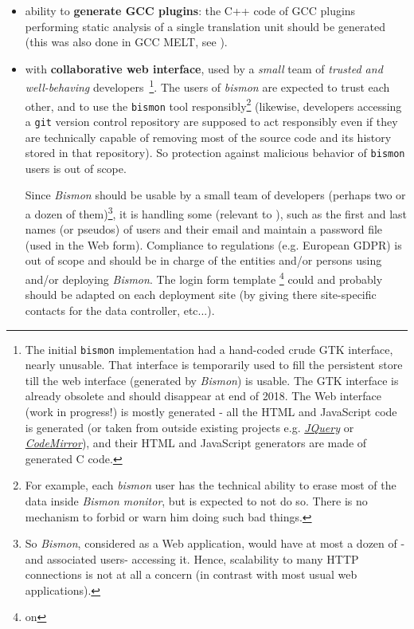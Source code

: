 \begin{itemize}
    \item ability to \textbf{generate GCC plugins}: the C++ code of
      GCC plugins  performing static analysis of a single translation
      unit should be generated (this was also done in GCC MELT, see \cite{Starynkevitch-DSL2011}).

    \item with \textbf{collaborative web interface},  used
      by a \emph{small} team of \emph{trusted and well-behaving}
      developers~\footnote{The initial \texttt{bismon} implementation
        had a hand-coded crude GTK interface, nearly unusable. That
        interface is temporarily used to fill the persistent store
        till the web interface (generated by \emph{Bismon}) is
        usable. The GTK interface is already obsolete and should
        disappear at end of 2018. The Web interface (work in
        progress!) is mostly generated - all the HTML and JavaScript
        code is generated (or taken from outside existing projects
        e.g. \href{http://jquery.com/}{\emph{JQuery}} or
        \href{http://codemirror.net/}{\emph{CodeMirror}}), and their
        HTML and JavaScript generators are made of generated C
        code.}. The users of \emph{bismon} are expected to trust each
      other, and to use the \texttt{bismon} tool
      responsibly\footnote{For example, each \emph{bismon} user has
        the technical ability to erase most of the data inside
        \textit{Bismon monitor}, but is expected to not do so. There
        is no mechanism to forbid or warn him doing such bad things.}
      (likewise, developers accessing a \texttt{git} version control
      repository are supposed to act responsibly even if they are
      technically capable of removing most of the source code and its
      history stored in that repository). So protection against
      malicious behavior of \texttt{bismon} users is out of scope.

      Since \textit{Bismon} should be usable by a small team of
      developers (perhaps two or a dozen of them)\footnote{So
        \textit{Bismon}, considered as a Web application, would have
        at most a dozen of  -and associated
        users- accessing it. Hence, scalability to many HTTP
        connections is not at all a concern (in contrast with most
        usual web applications).}, it is handling some  (relevant to ), such as
      the first and last names (or pseudos) of users and their email
      and maintain a password file (used in the Web
       form). Compliance to regulations
      (e.g. European GDPR) is out of scope and should be in charge of
      the entities and/or persons using and/or deploying
      \textit{Bismon}. The login form template \footnote{on
        }
      could and probably should be adapted on each deployment site (by
      giving there site-specific contacts for the data controller,
      etc...).


\end{itemize}
